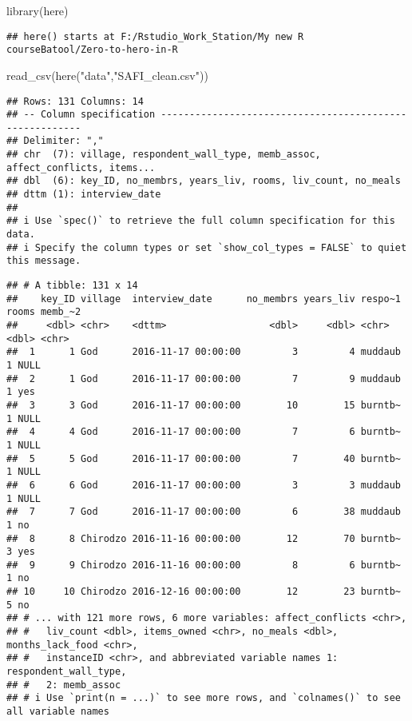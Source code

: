 \documentclass[
]{article}
\newenvironment{Shaded}{\begin{snugshade}}{\end{snugshade}}
\newcommand{\FunctionTok}[1]{\textcolor[rgb]{0.00,0.00,0.00}{#1}}
\newcommand{\NormalTok}[1]{#1}
\newcommand{\StringTok}[1]{\textcolor[rgb]{0.31,0.60,0.02}{#1}}
\begin{document}
\begin{Shaded}
\begin{Highlighting}[]
\FunctionTok{library}\NormalTok{(here)}
\end{Highlighting}
\end{Shaded}

\begin{verbatim}
## here() starts at F:/Rstudio_Work_Station/My new R courseBatool/Zero-to-hero-in-R
\end{verbatim}

\begin{Shaded}
\begin{Highlighting}[]
\FunctionTok{read\_csv}\NormalTok{(}\FunctionTok{here}\NormalTok{(}\StringTok{"data"}\NormalTok{,}\StringTok{"SAFI\_clean.csv"}\NormalTok{))}
\end{Highlighting}
\end{Shaded}

\begin{verbatim}
## Rows: 131 Columns: 14
## -- Column specification --------------------------------------------------------
## Delimiter: ","
## chr  (7): village, respondent_wall_type, memb_assoc, affect_conflicts, items...
## dbl  (6): key_ID, no_membrs, years_liv, rooms, liv_count, no_meals
## dttm (1): interview_date
## 
## i Use `spec()` to retrieve the full column specification for this data.
## i Specify the column types or set `show_col_types = FALSE` to quiet this message.
\end{verbatim}

\begin{verbatim}
## # A tibble: 131 x 14
##    key_ID village  interview_date      no_membrs years_liv respo~1 rooms memb_~2
##     <dbl> <chr>    <dttm>                  <dbl>     <dbl> <chr>   <dbl> <chr>  
##  1      1 God      2016-11-17 00:00:00         3         4 muddaub     1 NULL   
##  2      1 God      2016-11-17 00:00:00         7         9 muddaub     1 yes    
##  3      3 God      2016-11-17 00:00:00        10        15 burntb~     1 NULL   
##  4      4 God      2016-11-17 00:00:00         7         6 burntb~     1 NULL   
##  5      5 God      2016-11-17 00:00:00         7        40 burntb~     1 NULL   
##  6      6 God      2016-11-17 00:00:00         3         3 muddaub     1 NULL   
##  7      7 God      2016-11-17 00:00:00         6        38 muddaub     1 no     
##  8      8 Chirodzo 2016-11-16 00:00:00        12        70 burntb~     3 yes    
##  9      9 Chirodzo 2016-11-16 00:00:00         8         6 burntb~     1 no     
## 10     10 Chirodzo 2016-12-16 00:00:00        12        23 burntb~     5 no     
## # ... with 121 more rows, 6 more variables: affect_conflicts <chr>,
## #   liv_count <dbl>, items_owned <chr>, no_meals <dbl>, months_lack_food <chr>,
## #   instanceID <chr>, and abbreviated variable names 1: respondent_wall_type,
## #   2: memb_assoc
## # i Use `print(n = ...)` to see more rows, and `colnames()` to see all variable names
\end{verbatim}
\end{document}
